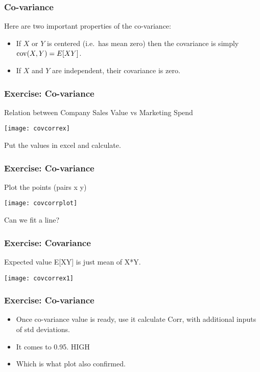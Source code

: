 \begin{frame}
\frametitle{Co-variance}

Here are two important properties of the co-variance:

\begin{itemize}

\item If $X$ or $Y$ is centered (i.e.\ has mean zero) then the
  covariance is simply ${\rm cov}(X,Y) = E[XY]$.

\item If $X$ and $Y$ are independent, their covariance is zero.

\end{itemize}

\end{frame}

\begin{frame}
\frametitle{Exercise: Co-variance}

Relation between Company Sales Value vs Marketing Spend
\begin{center}
\texttt{[image: covcorrex]}
\end{center}
Put the values in excel and calculate.
\end{frame}

\begin{frame}
\frametitle{Exercise: Co-variance}

Plot the points (pairs x y)
\begin{center}
\texttt{[image: covcorrplot]}
\end{center}
Can we fit a line?
\end{frame}

\begin{frame}
\frametitle{Exercise: Covariance}
Expected value E[XY] is just mean of X*Y.
\begin{center}
\texttt{[image: covcorrex1]}
\end{center}
\end{frame}

\begin{frame}
\frametitle{Exercise: Co-variance}
\begin{itemize}
\item Once co-variance value is ready, use it calculate Corr, with additional inputs of std deviations. 
\item It comes to 0.95. HIGH
\item Which is what plot also confirmed.
\end{itemize}
\end{frame}


